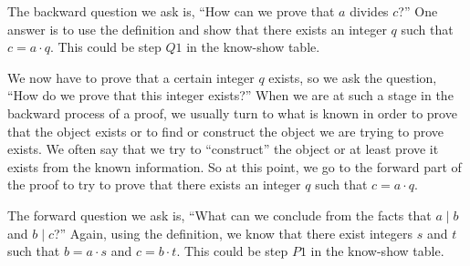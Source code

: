 %
%
The backward question we ask is, ``How can we prove that  $a$  divides  $c$?''  One answer is to use the definition and show that there exists an integer  $q$  such that  $c = a \cdot q$.  This could be step $Q1$ in the know-show table.

We now have to prove that a certain integer $q$ exists, so we ask the question, ``How do we prove that this integer exists?''  When we are at such a stage in the backward process of a proof, we usually turn to what is known in order to prove that the object exists or to find or construct the object we are trying to prove exists.  We often say that we try to ``construct'' the object or at least prove it exists from the known information.  So at this point, we go to the forward part of the proof to try to prove that there exists an integer $q$ such that $c = a \cdot q$.

The forward question we ask is, ``What can we conclude from the facts that  $a \mid b$  and  $b \mid c$?''  Again, using the definition, we know that there exist integers  $s$  and  $t$  such that  $b = a \cdot s$ and  $c = b \cdot t$.   This could be step $P1$ in the know-show table.

